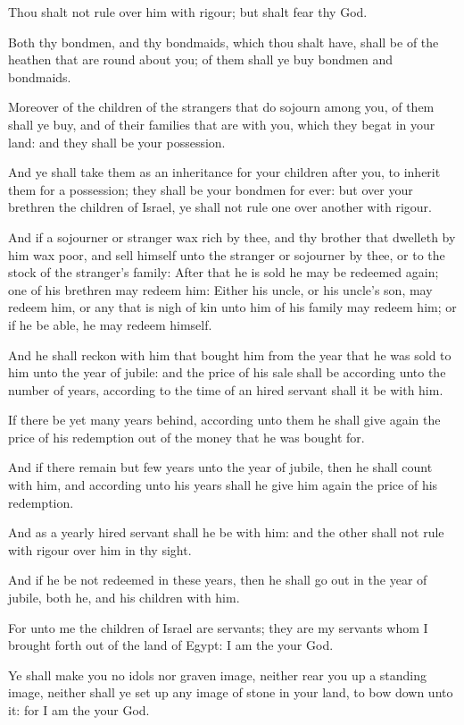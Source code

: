 \Verse Thou shalt not rule over him with rigour; but shalt fear thy God.

\Verse Both thy bondmen, and thy bondmaids, which thou shalt have, shall be of the heathen that are round about you; of them shall ye buy bondmen and bondmaids.

\Verse Moreover of the children of the strangers that do sojourn among you, of them shall ye buy, and of their families that are with you, which they begat in your land: and they shall be your possession.

\Verse And ye shall take them as an inheritance for your children after you, to inherit them for a possession; they shall be your bondmen for ever: but over your brethren the children of Israel, ye shall not rule one over another with rigour.

\Verse And if a sojourner or stranger wax rich by thee, and thy brother that dwelleth by him wax poor, and sell himself unto the stranger or sojourner by thee, or to the stock of the stranger's family: \Verse After that he is sold he may be redeemed again; one of his brethren may redeem him: \Verse Either his uncle, or his uncle's son, may redeem him, or any that is nigh of kin unto him of his family may redeem him; or if he be able, he may redeem himself.

\Verse And he shall reckon with him that bought him from the year that he was sold to him unto the year of jubile: and the price of his sale shall be according unto the number of years, according to the time of an hired servant shall it be with him.

\Verse If there be yet many years behind, according unto them he shall give again the price of his redemption out of the money that he was bought for.

\Verse And if there remain but few years unto the year of jubile, then he shall count with him, and according unto his years shall he give him again the price of his redemption.

\Verse And as a yearly hired servant shall he be with him: and the other shall not rule with rigour over him in thy sight.

\Verse And if he be not redeemed in these years, then he shall go out in the year of jubile, both he, and his children with him.

\Verse For unto me the children of Israel are servants; they are my servants whom I brought forth out of the land of Egypt: I am the \LORD your God.

\Chapter
\Verse Ye shall make you no idols nor graven image, neither rear you up a standing image, neither shall ye set up any image of stone in your land, to bow down unto it: for I am the \LORD your God.

